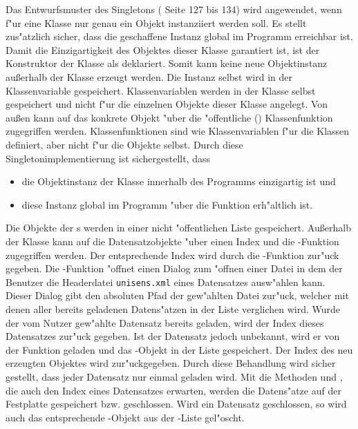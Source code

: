 Das Entwurfsmuster des Singletons (\cite{Gamma1995} Seite 127 bis 134) wird angewendet, wenn f"ur eine Klasse nur genau ein Objekt instanziiert werden soll.
Es stellt zus"atzlich sicher, dass die geschaffene Instanz global im Programm erreichbar ist.
Damit die Einzigartigkeit des Objektes dieser Klasse garantiert ist, ist der Konstruktor der Klasse als  deklariert.
Somit kann keine neue Objektinstanz au{\ss}erhalb der Klasse  erzeugt werden.
Die Instanz selbst wird in der Klassenvariable  gespeichert.
Klassenvariablen werden in der Klasse selbst gespeichert und nicht f"ur die einzelnen Objekte dieser Klasse angelegt.
Von au{\ss}en kann auf das konkrete Objekt "uber die "offentliche () Klassenfunktion  zugegriffen werden.
Klassenfunktionen sind wie Klassenvariablen f"ur die Klassen definiert, aber nicht f"ur die Objekte selbst.
Durch diese Singletonimplementierung ist sichergestellt, dass
\begin{itemize}
	\item die Objektinstanz  der Klasse  innerhalb des Programms einzigartig ist und
	\item diese Instanz global im Programm "uber die Funktion  erh"altlich ist.
\end{itemize}

Die Objekte der s werden in einer nicht "offentlichen Liste  gespeichert.
Au{\ss}erhalb der Klasse kann auf die Datensatzobjekte "uber einen Index und die -Funktion zugegriffen werden.
Der entsprechende Index wird durch die -Funktion zur"uck gegeben.
Die -Funktion "offnet einen Dialog zum "offnen einer Datei in dem der Benutzer die Headerdatei \verb|unisens.xml| eines Datensatzes ausw"ahlen kann.
Dieser Dialog gibt den absoluten Pfad der gew"ahlten Datei zur"uck, welcher mit denen aller bereits geladenen Datens"atzen in der Liste  verglichen wird.
Wurde der vom Nutzer gew"ahlte Datensatz bereits geladen, wird der Index dieses Datensatzes zur"uck gegeben.
Ist der Datensatz jedoch unbekannt, wird er von der Funktion geladen und das -Objekt in der Liste gespeichert.
Der Index des neu erzeugten Objektes wird zur"uckgegeben.
Durch diese Behandlung wird sicher gestellt, dass jeder Datensatz nur einmal geladen wird.
Mit die Methoden  und , die auch den Index eines Datensatzes erwarten, werden die Datens"atze auf der Festplatte gespeichert bzw. geschlossen.
Wird ein Datensatz geschlossen, so wird auch das entsprechende -Objekt aus der -Liste gel"oscht.


